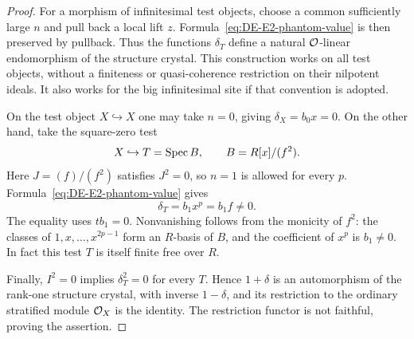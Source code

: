 \begin{proof}
For a morphism of infinitesimal test objects, choose a common sufficiently large $n$ and pull back a local lift $z$.  Formula~\eqref{eq:DE-E2-phantom-value} is then preserved by pullback.  Thus the functions $\delta_T$ define a natural $\mathcal O$-linear endomorphism of the structure crystal.  This construction works on all test objects, without a finiteness or quasi-coherence restriction on their nilpotent ideals.  It also works for the big infinitesimal site if that convention is adopted.

On the test object $X\hookrightarrow X$ one may take $n=0$, giving
$\delta_X=b_0x=0$.  On the other hand, take the square-zero test
\[
             X\hookrightarrow T=\operatorname{Spec} B,\qquad B=R[x]/(f^2).
\]
Here $J=(f)/(f^2)$ satisfies $J^2=0$, so $n=1$ is allowed for every $p$.  Formula~\eqref{eq:DE-E2-phantom-value} gives
\[
                  \delta_T=b_1x^p=b_1f\ne0.
\]
The equality uses $tb_1=0$.  Nonvanishing follows from the monicity of $f^2$: the classes of $1,x,\ldots,x^{2p-1}$ form an $R$-basis of $B$, and the coefficient of $x^p$ is $b_1\ne0$.  In fact this test $T$ is itself finite free over $R$.

Finally, $I^2=0$ implies $\delta_T^2=0$ for every $T$.  Hence $1+\delta$ is an automorphism of the rank-one structure crystal, with inverse $1-\delta$, and its restriction to the ordinary stratified module $\mathcal O_X$ is the identity.  The restriction functor is not faithful, proving the assertion.
\end{proof}


